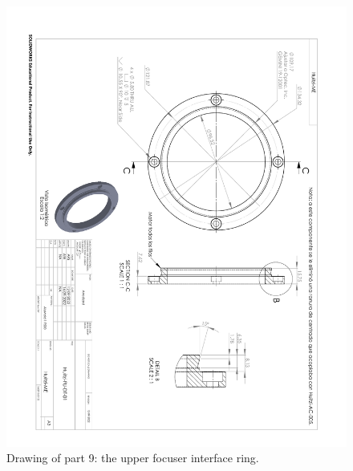 \begin{figure}
\begin{center}
\includegraphics[angle=180,width=0.9\linewidth]{figures/huitzi-f20-part-9.pdf}
\end{center}
\caption{Drawing of part 9: the upper focuser interface ring.}
\label{figure:huitzi-f20-part-9}
\end{figure}


